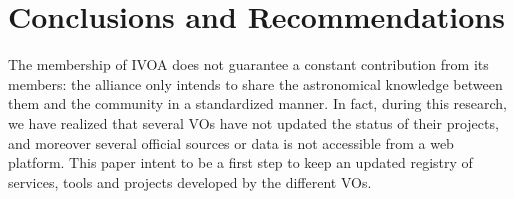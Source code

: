 \section{Conclusions and Recommendations}

The membership of IVOA does not
guarantee a constant contribution from its members: the alliance only 
intends to share the astronomical
knowledge between them and the community in a standardized manner. 
In fact, during this research, we have realized that several VOs have not 
updated the status of their projects, and moreover several official sources 
or data is not accessible from a web platform. This paper intent to be
a first step to keep an updated registry of services, tools and projects
developed by the different VOs. 


